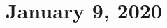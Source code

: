 \documentclass[11pt]{article}
\theoremstyle{plain}
\theoremstyle{definition}
\theoremstyle{remark}
\begin{document}
\section{January 9, 2020}



% 
% 

\end{document}
